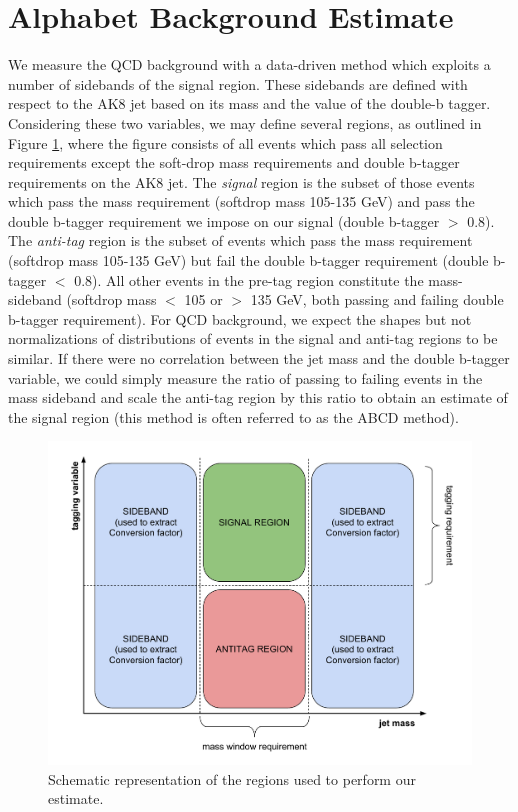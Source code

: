 \section{Alphabet Background Estimate\label{ss:Alphabet}}
We measure the QCD background with a data-driven method which exploits a number of sidebands of the signal region. These sidebands are defined with respect to the AK8 jet based on its mass and the value of the double-b tagger. Considering these two variables, we may define several regions, as outlined in Figure \ref{F:ABCDEFregions}, where the figure consists of all events which pass all selection requirements except the soft-drop mass requirements and double b-tagger requirements on the AK8 jet. The \textit{signal} region is the subset of those events which pass the mass requirement (softdrop mass 105-135 GeV) and pass the double b-tagger requirement we impose on our signal (double b-tagger $>$ 0.8). The \textit{anti-tag} region is the subset of events which pass the mass requirement (softdrop mass 105-135 GeV) but fail the double b-tagger requirement (double b-tagger $<$ 0.8). All other events in the pre-tag region constitute the mass-sideband (softdrop mass $<$ 105 or $>$ 135 GeV, both passing and failing double b-tagger requirement). For QCD background, we expect the shapes but not normalizations of distributions of events in the signal and anti-tag regions to be similar. If there were no correlation between the jet mass and the double b-tagger variable, we could simply measure the ratio of passing to failing events in the mass sideband and scale the anti-tag region by this ratio to obtain an estimate of the signal region (this method is often referred to as the ABCD method).
\begin{figure}[h!]
  \centering
    \includegraphics[width=\textwidth]{F5/pretag2.pdf}
  \caption{Schematic representation of the regions used to perform our estimate.} \label{F:ABCDEFregions}
\end{figure}

